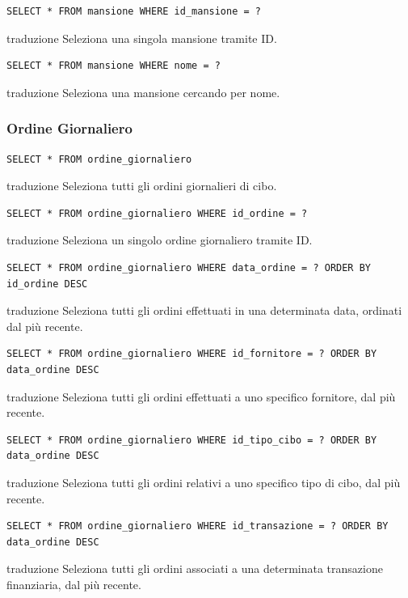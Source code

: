 \documentclass[12pt,a4paper]{report}
\begin{document}
\begin{lstlisting}[style=sqlstyle]
SELECT * FROM mansione WHERE id_mansione = ?
\end{lstlisting}
traduzione {Seleziona una singola mansione tramite ID.}

\begin{lstlisting}[style=sqlstyle]
SELECT * FROM mansione WHERE nome = ?
\end{lstlisting}
traduzione {Seleziona una mansione cercando per nome.}

\subsubsection*{Ordine Giornaliero}
\begin{lstlisting}[style=sqlstyle]
SELECT * FROM ordine_giornaliero
\end{lstlisting}
traduzione {Seleziona tutti gli ordini giornalieri di cibo.}

\begin{lstlisting}[style=sqlstyle]
SELECT * FROM ordine_giornaliero WHERE id_ordine = ?
\end{lstlisting}
traduzione {Seleziona un singolo ordine giornaliero tramite ID.}

\begin{lstlisting}[style=sqlstyle]
SELECT * FROM ordine_giornaliero WHERE data_ordine = ? ORDER BY id_ordine DESC
\end{lstlisting}
traduzione {Seleziona tutti gli ordini effettuati in una determinata data, ordinati dal più recente.}

\begin{lstlisting}[style=sqlstyle]
SELECT * FROM ordine_giornaliero WHERE id_fornitore = ? ORDER BY data_ordine DESC
\end{lstlisting}
traduzione {Seleziona tutti gli ordini effettuati a uno specifico fornitore, dal più recente.}

\begin{lstlisting}[style=sqlstyle]
SELECT * FROM ordine_giornaliero WHERE id_tipo_cibo = ? ORDER BY data_ordine DESC
\end{lstlisting}
traduzione {Seleziona tutti gli ordini relativi a uno specifico tipo di cibo, dal più recente.}

\begin{lstlisting}[style=sqlstyle]
SELECT * FROM ordine_giornaliero WHERE id_transazione = ? ORDER BY data_ordine DESC
\end{lstlisting}
traduzione {Seleziona tutti gli ordini associati a una determinata transazione finanziaria, dal più recente.}
\end{document}
